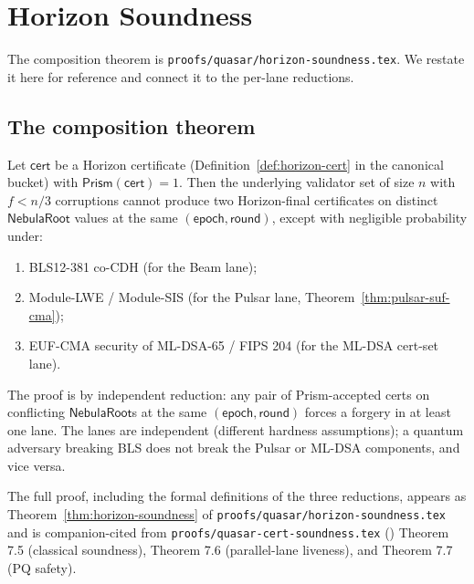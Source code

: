 \section{Horizon Soundness}
\label{sec:horizon-soundness}

The composition theorem is \texttt{proofs/quasar/horizon-soundness.tex}. We restate it here for reference and connect it to the per-lane reductions.

\subsection{The composition theorem}

\begin{theorem}
\label{thm:horizon-soundness}
Let $\mathsf{cert}$ be a Horizon certificate (Definition~\ref{def:horizon-cert} in the canonical bucket) with $\mathsf{Prism}(\mathsf{cert}) = 1$. Then the underlying validator set of size $n$ with $f < n/3$ corruptions cannot produce two Horizon-final certificates on distinct $\mathsf{NebulaRoot}$ values at the same $(\mathsf{epoch}, \mathsf{round})$, except with negligible probability under:
\begin{enumerate}[leftmargin=2em,nosep]
  \item BLS12-381 co-CDH (for the Beam lane);
  \item Module-LWE / Module-SIS (for the Pulsar lane, Theorem~\ref{thm:pulsar-suf-cma});
  \item EUF-CMA security of ML-DSA-65 / FIPS 204 (for the ML-DSA cert-set lane).
\end{enumerate}
The proof is by independent reduction: any pair of Prism-accepted certs on conflicting $\mathsf{NebulaRoot}$s at the same $(\mathsf{epoch}, \mathsf{round})$ forces a forgery in at least one lane. The lanes are independent (different hardness assumptions); a quantum adversary breaking BLS does not break the Pulsar or ML-DSA components, and vice versa.
\end{theorem}

The full proof, including the formal definitions of the three reductions, appears as Theorem~\ref{thm:horizon-soundness} of \texttt{proofs/quasar/horizon-soundness.tex} and is companion-cited from \texttt{proofs/quasar-cert-soundness.tex} (\cite{quasarcertsoundness}) Theorem 7.5 (classical soundness), Theorem 7.6 (parallel-lane liveness), and Theorem 7.7 (PQ safety).

